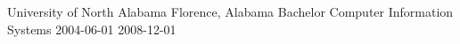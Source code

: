 \educationitem
    {University of North Alabama}
    {Florence, Alabama}
    {Bachelor Computer Information Systems}
    {2004-06-01}
    {2008-12-01}